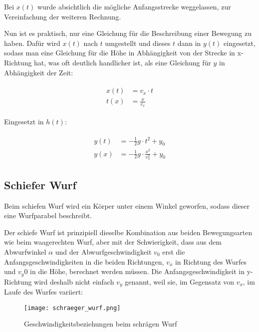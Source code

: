 \noindent Bei $x(t)$ wurde absichtlich die mögliche Anfangsstrecke weggelassen, zur Vereinfachung der weiteren Rechnung.

Nun ist es praktisch, nur eine Gleichung für die Beschreibung einer Bewegung zu haben. Dafür wird $x(t)$ nach $t$ umgestellt und dieses $t$ dann in $y(t)$  eingesetzt, sodass man eine Gleichung für die Höhe in Abhängigkeit von der Strecke in x-Richtung hat, was oft deutlich handlicher ist, als eine Gleichung für $y$ in Abhängigkeit der Zeit:

\begin{align}
\begin{split}
	x(t) &= v_x \cdot t \\
	t(x) &= \frac{x}{v_x}
\end{split}
\end{align}

\noindent Eingesetzt in $h(t)$:

\begin{align} \label{eq:waagerechtgesamt}
\begin{split}
	y(t) &= -\frac{1}{2}g \cdot t^2 + y_0 \\
	y(x) &= -\frac{1}{2}g \cdot \frac{x^2}{v_x^2} + y_0
\end{split}
\end{align}


\subsection{Schiefer Wurf}

Beim schiefen Wurf wird ein Körper unter einem Winkel geworfen, sodass dieser eine Wurfparabel beschreibt.

Der schiefe Wurf ist prinzipiell dieselbe Kombination aus beiden Bewegungsarten wie beim waagerechten Wurf, aber mit der Schwierigkeit, dass aus dem Abwurfwinkel $\alpha$ und der Abwurfgeschwindigkeit $v_0$ erst die Anfangsgeschwindigkeiten in die beiden Richtungen, $v_x$ in Richtung des Wurfes und $v_y0$ in die Höhe, berechnet werden müssen. Die Anfangsgeschwindigkeit in y-Richtung wird deshalb nicht einfach $v_y$ genannt, weil sie, im Gegensatz von $v_x$, im Laufe des Wurfes variiert:



\begin{figure}[h!]
	\centering
	\begin{comment} Gnuplot:
set xlabel "x"
set ylabel "y"
set output "schraeger_wurf.png"
set arrow 3 front to 2.5,3.125 size screen 0.025,22,60 filled ls 1
set arrow 4 front to 2.5,0 size screen 0.025,22,60 filled ls 1
set arrow 5 front to 0,3.125 size screen 0.025,22,60 filled ls 1
set label 1 "v_x" at 1.2,0.3 font 'Verdana,48'
set label 2 "v_0" at 1.2,2.25 font 'Verdana,48'
set label 3 "v_{y0}" at 0.1,1.7 font 'Verdana,48'
plot (-0.26*(x*x)+1.25*x) ls 1
	\end{comment}
	\texttt{[image: schraeger\_wurf.png]}
	\caption{Geschwindigkeitsbeziehungen beim schrägen Wurf}
\end{figure}


